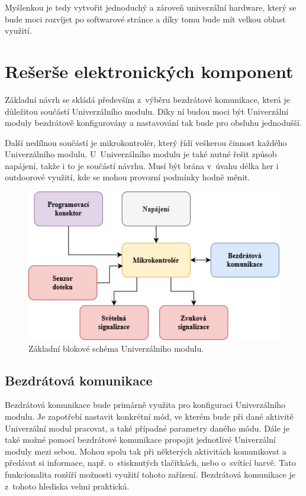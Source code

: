 Myšlenkou je tedy vytvořit jednoduchý a zároveň univerzální hardware, který se bude moci rozvíjet po softwarové stránce a díky tomu bude mít velkou 
oblast využití. 


\chapter{Rešerše elektronických komponent}
Základní návrh se skládá především z~výběru bezdrátové komunikace, která je důležitou součástí Univerzálního modulu. Díky ní budou moci být Univerzální 
moduly bezdrátově konfigurovány a nastavování tak bude pro obsluhu jednodušší. 

Další nedílnou součástí je mikrokontrolér, který řídí veškerou činnost každého Univerzálního modulu. U~Univerzálního modulu je také nutné řešit způsob napájení,
takže i to je součástí návrhu. Musí být brána v~úvahu délka her i outdoorové využití, kde se mohou provozní podmínky hodně měnit. 

\begin{figure}[!h]
  \begin{center}
    \includegraphics[scale=0.75]{obrazky/zakladni_blokove_schema.jpg}
  \end{center}
  \caption[Základní blokové schéma Univerzálního modulu]{Základní blokové schéma Univerzálního modulu.}
\end{figure}

\section{Bezdrátová komunikace}
Bezdrátová komunikace bude primárně využita pro konfiguraci Univerzálního modulu. Je zapotřebí nastavit konkrétní mód, ve kterém bude při dané 
aktivitě Univerzální modul pracovat, a také případné parametry daného módu. Dále je také možné pomocí bezdrátové komunikace propojit jednotlivé 
Univerzální moduly mezi sebou. Mohou spolu tak při některých aktivitách komunikovat a předávat si informace, např. o~stisknutých tlačítkách, nebo 
o~svítící barvě. Tato funkcionalita rozšíří možnosti využití tohoto zařízení. Bezdrátová komunikace je z~tohoto hlediska velmi praktická. 

